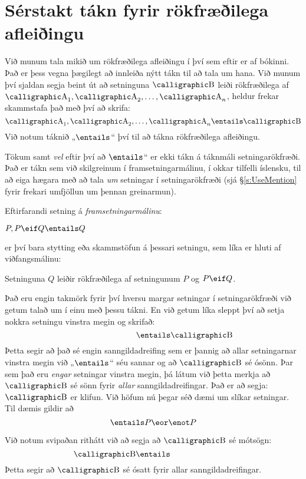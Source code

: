 \section{Sérstakt tákn fyrir rökfræðilega afleiðingu}

Við munum tala mikið um rökfræðilega afleiðingu í því sem eftir er af bókinni. Það er þess vegna þægilegt að innleiða nýtt tákn til að tala um hana. Við munum því sjaldan segja beint út að setninguna $\meta{B}$ leiði rökfræðilega af $\meta{A}_1, \meta{A}_2, \ldots, \meta{A}_n$, heldur frekar skammstafa það með því að skrifa: $$\meta{A}_1, \meta{A}_2, \ldots, \meta{A}_n \entails \meta{B}$$
Við notum táknið „$\entails$“ því til að tákna rökfræðilega afleiðingu.

Tökum samt \emph{vel} eftir því að $\entails$“ er ekki tákn á táknmáli setningarökfræði. Það er tákn sem við skilgreinum í framsetningarmálinu, í okkar tilfelli íslensku, til að eiga hægara með að tala \emph{um} setningar í setningarökfræði (sjá \S\ref{s:UseMention} fyrir frekari umfjöllun um þennan greinarmun).

Eftirfarandi setning á \emph{framsetningarmálinu}:
	\begin{ebullet}
		\item $P, P \eif Q \entails Q$
	\end{ebullet}
er því bara stytting eða skammstöfun á þessari setningu, sem líka er hluti af viðfangsmálinu:	
	\begin{ebullet}
		\item Setninguna $Q$ leiðir rökfræðilega af setningunum $P$ og $P \eif Q$.
	\end{ebullet}
Það eru engin takmörk fyrir því hversu margar setningar í setningarökfræði við getum talað um í einu með þessu tákni. En við getum líka sleppt því að setja nokkra setningu vinstra megin og skrifað: 
	$$\phantom{\meta{A}}\entails \meta{B}$$
Þetta segir að það sé engin sanngildadreifing sem er þannig að allar setningarnar vinstra megin við „$\entails$“ séu sannar og að $\meta{B}$ sé ósönn. Þar sem það eru \emph{engar} setningar vinstra megin, þá látum við þetta merkja að $\meta{B}$ sé sönn fyrir \emph{allar} sanngildadreifingar. Það er að segja: $\meta{B}$ er klifun. Við höfum nú þegar séð dæmi um slíkar setningar. Til dæmis gildir að $$ \entails P \eor \enot P$$

Við notum svipaðan rithátt við að segja að $\meta{B}$ sé mótsögn:
	$$\meta{B} \entails\phantom{\meta{C}}$$
Þetta segir að $\meta{B}$ sé ósatt fyrir allar sanngildadreifingar.

